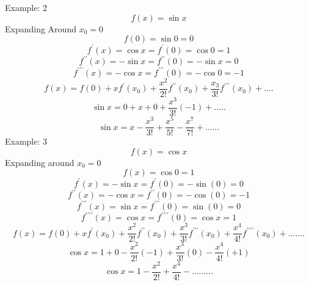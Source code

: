 \newline
Example: 2
\begin{displaymath}
f(x) = \sin x
\end{displaymath}
Expanding Around $ x_0 = 0 $
\begin{displaymath}
f(0) = \sin 0 = 0
\end{displaymath}
\begin{displaymath}
f^\prime(x)=\cos x =f^\prime(0)=\cos 0 = 1
\end{displaymath}
\begin{displaymath}
f^{\prime\prime}(x)=-\sin x = f^{\prime\prime}(0)= -\sin x = 0
\end{displaymath}
\begin{displaymath}
f^{\prime\prime\prime}(x)=-\cos x = f^{\prime\prime\prime}(0)=-\cos 0 = -1
\end{displaymath}
\begin{displaymath}
f(x)=f(0)+xf^\prime(x_0)+\frac{x^2}{2!}f^{\prime\prime}(x_0)+\frac{x_3}{3!}f^{\prime\prime\prime}(x_0)+....
\end{displaymath}
\begin{displaymath}
\sin x = 0+x+0+\frac{x^3}{3!}(-1)+.....
\end{displaymath}
\begin{displaymath}
\sin x = x-\frac{x^3}{3!}+\frac{x^5}{5!}-\frac{x^7}{7!}+......
\end{displaymath}
\newline
Example: 3
\begin{displaymath}
f(x)= \cos x
\end{displaymath}
Expanding around $ x_0=0 $
\begin{displaymath}
f(x) = \cos 0 = 1
\end{displaymath}
\begin{displaymath}
f^\prime(x) = -\sin x = f^\prime(0)=-\sin(0) = 0
\end{displaymath}
\begin{displaymath}
f^{\prime\prime}(x) = - \cos x = f^{\prime\prime}(0)= -\cos(0) = -1
\end{displaymath}
\begin{displaymath}
f^{\prime\prime\prime}(x)= \sin x = f^{\prime\prime\prime}(0)=\sin(0)= 0
\end{displaymath}
\begin{displaymath}
f^{\prime\prime\prime\prime}(x)= \cos x = f^{\prime\prime\prime\prime}(0)=\cos x = 1
\end{displaymath}
\begin{displaymath}
f(x) = f(0)+xf^\prime(x_0)+\frac{x^2}{2!}f^{\prime\prime}(x_0)+\frac{x^3}{3!}f^{\prime\prime\prime}(x_0)+\frac{x^4}{4!}
f^{\prime\prime\prime\prime}(x_0)+.......
\end{displaymath}
\begin{displaymath}
\cos x = 1+0-\frac{x^2}{2!}(-1)+\frac{x^3}{3!}(0)-\frac{x^4}{4!}(+1)
\end{displaymath}
\begin{displaymath}
\cos x = 1-\frac{x^2}{2!}+\frac{x^4}{4!}-.........
\end{displaymath}

